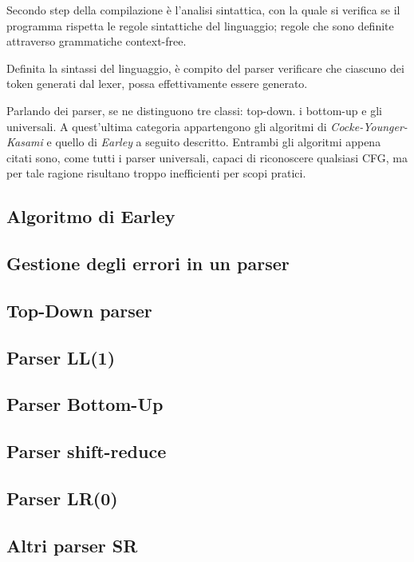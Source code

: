 \documentclass{subfiles}
\begin{document}
Secondo step della compilazione è l'analisi sintattica, con la quale si verifica se il programma rispetta le regole sintattiche del linguaggio;
regole che sono definite attraverso grammatiche context-free.

Definita la sintassi del linguaggio, è compito del parser verificare che ciascuno dei token generati dal lexer, possa effettivamente essere generato.

Parlando dei parser, se ne distinguono tre classi: top-down. i bottom-up e gli universali.
A quest'ultima categoria appartengono gli algoritmi di \emph{Cocke-Younger-Kasami} e quello di \emph{Earley} a seguito descritto.
Entrambi gli algoritmi appena citati sono, come tutti i parser universali, capaci di riconoscere qualsiasi CFG,
ma per tale ragione risultano troppo inefficienti per scopi pratici.

\subsection{Algoritmo di Earley}

\clearpage

\subsection{Gestione degli errori in un parser}


\subsection{Top-Down parser}

\clearpage

\subsection{Parser LL(1)}


\subsection{Parser Bottom-Up}


\subsection{Parser shift-reduce}


\subsection{Parser LR(0)}


\subsection{Altri parser SR}

\end{document}
